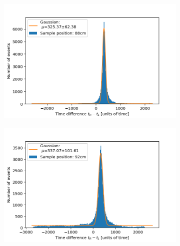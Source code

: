 \documentclass[]{article}
\begin{document}
\begin{figure}[H]
\centering
\medskip
\begin{subfigure}{0.48\textwidth}
\includegraphics[width=\linewidth]{Plots/Pos/88cm.png}
\end{subfigure}
\begin{subfigure}[c]{0.48\linewidth}
\includegraphics[width=\linewidth]{Plots/Pos/92cm.png}
\end{subfigure}


\end{figure}
\end{document}
